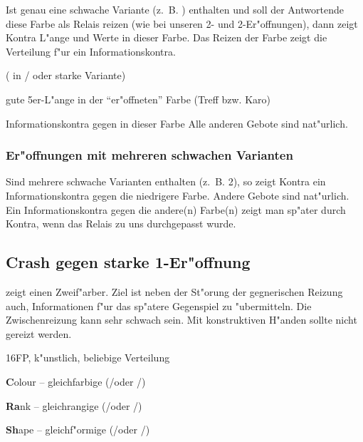 Ist genau eine schwache Variante (z.~B. ) enthalten und soll der
Antwortende diese Farbe als Relais reizen (wie bei unseren 2\tre- und
2\kar-Er"offnungen), dann zeigt Kontra L"ange und Werte in dieser Farbe. Das
Reizen der Farbe zeigt die Verteilung f"ur ein Informationskontra.

\bdsc
	\item[2\tre{}/\ka{}] ( in \ka{}/\co{} oder starke Variante)
	\bdsc
		\item[\kontra{}] gute 5\pl{}er-L"ange in der "`er"offneten"' Farbe (Treff bzw. Karo)
		\item[2\kar{}/2\coe{}] Informationskontra gegen  in dieser Farbe
	\edsc
\edsc
Alle anderen Gebote sind nat"urlich.

\subsubsection*{Er"offnungen mit mehreren schwachen Varianten}

Sind mehrere schwache Varianten enthalten (z.~B. 2\kar {}), so zeigt
Kontra ein Informationskontra gegen die niedrigere Farbe. Andere Gebote sind
nat"urlich. Ein Informationskontra gegen die andere(n) Farbe(n) zeigt man
sp"ater durch Kontra, wenn das Relais zu uns durchgepasst wurde.
\cite{retzlaff04}

\subsection{Crash gegen starke 1\tre-Er"offnung}

 zeigt einen Zweif"arber. Ziel ist neben der St"orung der
gegnerischen Reizung auch, Informationen f"ur das sp"atere Gegenspiel
zu "ubermitteln.  Die Zwischenreizung kann sehr schwach sein.  Mit
konstruktiven H"anden sollte  nicht gereizt werden.

\bdsc
\item[(1\tre)] 16\pl FP, k"unstlich, beliebige Verteilung
\bdsc
\item[\kontra] \textbf{C}olour -- gleichfarbige (\tr/\pi oder \ka/\co)
\item[1\kar] \textbf{Ra}nk -- gleichrangige (\tr/\ka oder \co/\pi)
\item[1\of] \nat
\item[1\SA] \textbf{Sh}ape -- gleichf"ormige (\tr/\co oder \ka/\pi)
\item[2\uf] \nat
\edsc
\edsc

\newpage
